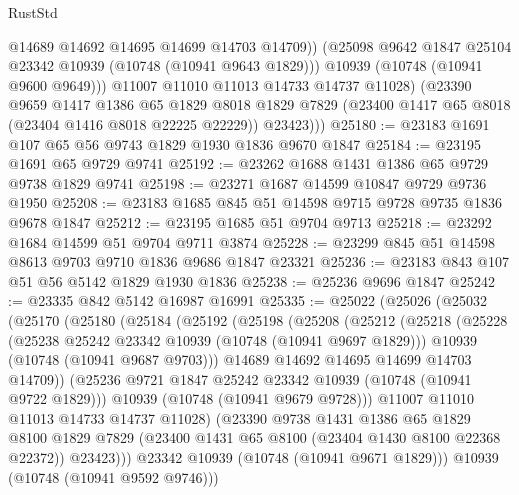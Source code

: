 \begin{lexlean}{RustStd}
\begin{coremodule}
                @14689
                @14692
                @14695
                @14699
                @14703
                @14709))
            (@25098 @9642 @1847 @25104 @23342 @10939 (@10748 (@10941 @9643 @1829)))
            @10939
            (@10748 (@10941 @9600 @9649)))
          @11007
          @11010
          @11013
          @14733
          @14737
          @11028)
        (@23390
          @9659
          @1417
          @1386
          @65
          @1829
          @8018
          @1829
          @7829
          (@23400 @1417 @65 @8018 (@23404 @1416 @8018 @22225 @22229))
          @23423)))
@25180 := @23183 @1691 @107 @65 @56 @9743 @1829 @1930 @1836 @9670 @1847
@25184 := @23195 @1691 @65 @9729 @9741
@25192 := @23262 @1688 @1431 @1386 @65 @9729 @9738 @1829 @9741
@25198 := @23271 @1687 @14599 @10847 @9729 @9736 @1950
@25208 := @23183 @1685 @845 @51 @14598 @9715 @9728 @9735 @1836 @9678 @1847
@25212 := @23195 @1685 @51 @9704 @9713
@25218 := @23292 @1684 @14599 @51 @9704 @9711 @3874
@25228 := @23299 @845 @51 @14598 @8613 @9703 @9710 @1836 @9686 @1847 @23321
@25236 := @23183 @843 @107 @51 @56 @5142 @1829 @1930 @1836
@25238 := @25236 @9696 @1847
@25242 := @23335 @842 @5142 @16987 @16991
@25335 := @25022
    (@25026
      (@25032
        (@25170
          (@25180
            (@25184
              (@25192
                (@25198
                  (@25208
                    (@25212
                      (@25218
                        (@25228
                          (@25238 @25242 @23342 @10939 (@10748 (@10941 @9697 @1829)))
                          @10939
                          (@10748 (@10941 @9687 @9703)))
                        @14689
                        @14692
                        @14695
                        @14699
                        @14703
                        @14709))
                    (@25236 @9721 @1847 @25242 @23342 @10939 (@10748 (@10941 @9722 @1829)))
                    @10939
                    (@10748 (@10941 @9679 @9728)))
                  @11007
                  @11010
                  @11013
                  @14733
                  @14737
                  @11028)
                (@23390
                  @9738
                  @1431
                  @1386
                  @65
                  @1829
                  @8100
                  @1829
                  @7829
                  (@23400 @1431 @65 @8100 (@23404 @1430 @8100 @22368 @22372))
                  @23423)))
            @23342
            @10939
            (@10748 (@10941 @9671 @1829)))
          @10939
          (@10748 (@10941 @9592 @9746)))

\end{coremodule}
\end{lexlean}
